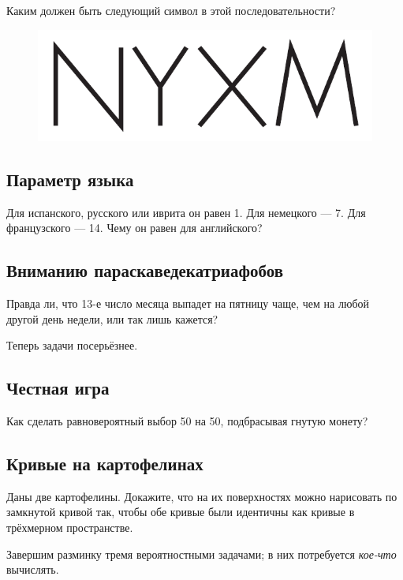 Каким должен быть следующий символ в этой последовательности?

\begin{figure}[h!]
\centering
\includegraphics[scale=0.5]{pics/ZYXW}
\end{figure}

\subsection*{Параметр языка}

Для испанского, русского или иврита он равен 1.
Для немецкого --- 7.
Для французского --- 14.
Чему он равен для английского?

\subsection*{Вниманию параскаведекатриафобов}

Правда ли, что 13-е число месяца выпадет на пятницу чаще,
чем на любой другой день недели,
или так лишь кажется?

\medskip

Теперь задачи посерьёзнее.

\subsection*{Честная игра}

Как сделать равновероятный выбор 50 на 50, подбрасывая гнутую монету?

\subsection*{Кривые на картофелинах}

Даны две картофелины.
Докажите, что на их поверхностях можно нарисовать по замкнутой кривой так, чтобы обе кривые были идентичны как кривые в трёхмерном пространстве.

\medskip

Завершим разминку тремя вероятностными задачами; в них потребуется \emph{кое-что} вычислять.

